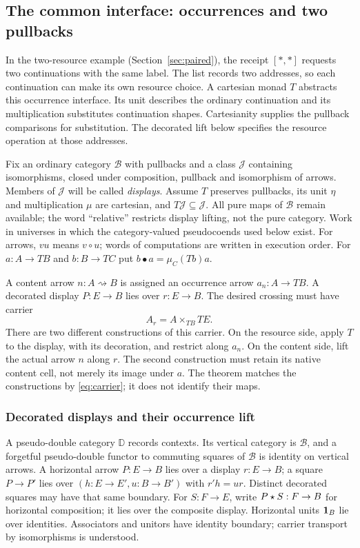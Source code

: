 \documentclass[11pt]{article}
\numberwithin{equation}{section}
\theoremstyle{definition}\newtheorem{definition}[theorem]{Definition}
\newcommand{\B}{\mathcal B}\newcommand{\J}{\mathcal J}
\newcommand{\D}{\mathbb D}\newcommand{\N}{\mathbb N}
\begin{document}
\subsection{The common interface: occurrences and two pullbacks}\label{sec:interface}
In the two-resource example (Section~\ref{sec:paired}), the receipt
$[*,*]$ requests two continuations with the same label. The list records
two addresses, so each continuation can make its own resource choice.
A cartesian monad $T$ abstracts this occurrence interface. Its unit
describes the ordinary continuation and its multiplication substitutes
continuation shapes. Cartesianity supplies the pullback comparisons
for substitution. The decorated lift below specifies the resource
operation at those addresses.

Fix an ordinary category $\B$ with pullbacks and a class $\J$ containing
isomorphisms, closed under composition, pullback and isomorphism of arrows.
Members of $\J$ will be called \emph{displays}. Assume $T$ preserves
pullbacks, its unit $\eta$ and multiplication $\mu$ are cartesian, and
$T\J\subseteq\J$. All pure maps of $\B$ remain available; the word
``relative'' restricts display lifting, not the pure category. Work in
universes in which the category-valued pseudocoends used below exist.
For arrows, $vu$ means $v\circ u$; words of computations are written in
execution order. For $a:A\to TB$ and $b:B\to TC$ put
$b\bullet a=\mu_C(Tb)a$.

A content arrow $n:A\rightsquigarrow B$ is assigned an occurrence arrow
$a_n:A\to TB$. A decorated display $P:E\to B$ lies over $r:E\to B$.
The desired crossing must have carrier
\begin{equation}\label{eq:carrier}
                         A_r=A\times_{TB}TE.
\end{equation}
There are two different constructions of this carrier. On the resource
side, apply $T$ to the display, with its decoration, and restrict along
$a_n$. On the content side, lift the actual arrow $n$ along $r$. The
second construction must retain its native content cell, not merely its
image under $a$. The theorem matches the constructions by
\eqref{eq:carrier}; it does not identify their maps.

\subsubsection{Decorated displays and their occurrence lift}\label{sec:decinput}
A pseudo-double category $\D$ records contexts. Its vertical category is
$\B$, and a forgetful pseudo-double functor to commuting squares of $\B$
is identity on vertical arrows. A horizontal arrow $P:E\to B$ lies over
a display $r:E\to B$; a square $P\to P'$ lies over
$(h:E\to E',u:B\to B')$ with $r'h=ur$. Distinct decorated squares
may have that same boundary. For $S:F\to E$, write $P\mathbin{\star} S:F\to B$
for horizontal composition; it lies over the composite display.
Horizontal units $\mathbf1_B$ lie over identities. Associators and unitors
have identity boundary; carrier transport by isomorphisms is understood.
\end{document}

